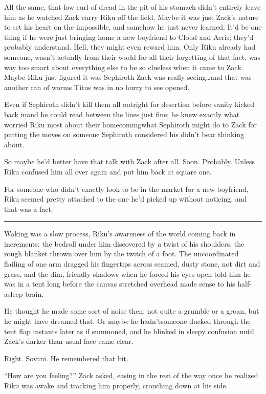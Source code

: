 All the same, that low curl of dread in the pit of his stomach didn't entirely leave him as he watched Zack carry Riku off the field. Maybe it was just Zack's nature to set his heart on the impossible, and somehow he just never learned. It'd be one thing if he were just bringing home a new boyfriend to Cloud and Aeris; they'd probably understand. Hell, they might even reward him. Only Riku already had someone, wasn't actually from their world for all their forgetting of that fact, was way too smart about everything else to be so clueless when it came to Zack. Maybe Riku just figured it was Sephiroth Zack was really seeing\ldots and that was another can of worms Titus was in no hurry to see opened.

Even if Sephiroth didn't kill them all outright for desertion before sanity kicked back in\textemdash and he could read between the lines just fine; he knew exactly what worried Riku most about their homecoming\textemdash what Sephiroth might do to Zack for putting the moves on someone Sephiroth considered his didn't bear thinking about.

So maybe he'd better have that talk with Zack after all. Soon. Probably. Unless Riku confused him all over again and put him back at square one.

For someone who didn't exactly look to be in the market for a new boyfriend, Riku seemed pretty attached to the one he'd picked up without noticing, and that was a fact.

\fancybreak{\pfbreakdisplay}


Waking was a slow process, Riku's awareness of the world coming back in increments: the bedroll under him discovered by a twist of his shoulders, the rough blanket thrown over him by the twitch of a foot. The uncoordinated flailing of one arm dragged his fingertips across seamed, dusty stone, not dirt and grass, and the dim, friendly shadows when he forced his eyes open told him he was in a tent long before the canvas stretched overhead made sense to his half-asleep brain.

He thought he made some sort of noise then, not quite a grumble or a groan, but he might have dreamed that. Or maybe he hadn't\textemdash someone ducked through the tent flap instants later as if summoned, and he blinked in sleepy confusion until Zack's darker-than-usual face came clear.

Right. Sovani. He remembered that bit.

``How are you feeling?'' Zack asked, easing in the rest of the way once he realized Riku was awake and tracking him properly, crouching down at his side.


